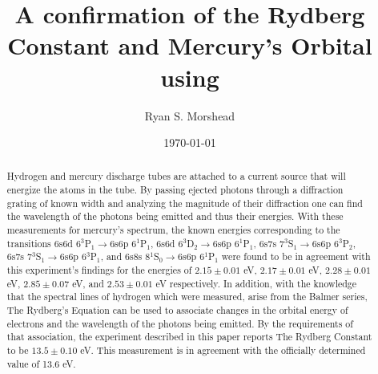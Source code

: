 \documentclass[prb,preprint]{revtex4-1}
\begin{document}
\title{A confirmation of the Rydberg Constant and Mercury's Orbital  using }

\author{Ryan S. Morshead}


\date{\today}

\begin{abstract}
Hydrogen and mercury discharge tubes are attached to a current source that will energize the atoms in the tube.  By passing ejected photons through a diffraction grating of known width and analyzing the magnitude of their diffraction one can find the wavelength of the photons being emitted and thus their energies. With these measurements for mercury's spectrum, the known energies corresponding to the transitions 6s6d 6$^3$P$_1\rightarrow$6s6p 6$^1$P$_1$, 6s6d 6$^3$D$_2\rightarrow$6s6p 6$^1$P$_1$, 6s7s 7$^3$S$_1\rightarrow$6s6p 6$^3$P$_2$, 6s7s 7$^3$S$_1\rightarrow$6s6p 6$^3$P$_1$, and 6s8s 8$^1$S$_0\rightarrow$6s6p 6$^1$P$_1$ were found to be in agreement with this experiment's findings for the energies of  $2.15\pm0.01$ eV, $2.17\pm0.01$ eV, $2.28\pm0.01$ eV, $2.85\pm0.07$ eV, and $2.53\pm0.01$ eV respectively. In addition, with the knowledge that the spectral lines of hydrogen which were measured, arise from the Balmer series, The Rydberg's Equation can be used to associate changes in the orbital energy of electrons and the wavelength of the photons being emitted. By the requirements of that association, the experiment described in this paper reports The Rydberg Constant to be $13.5\pm0.10$ eV. This measurement is in agreement with the officially determined value of 13.6 eV.



\end{abstract}


\maketitle
\end{document}
